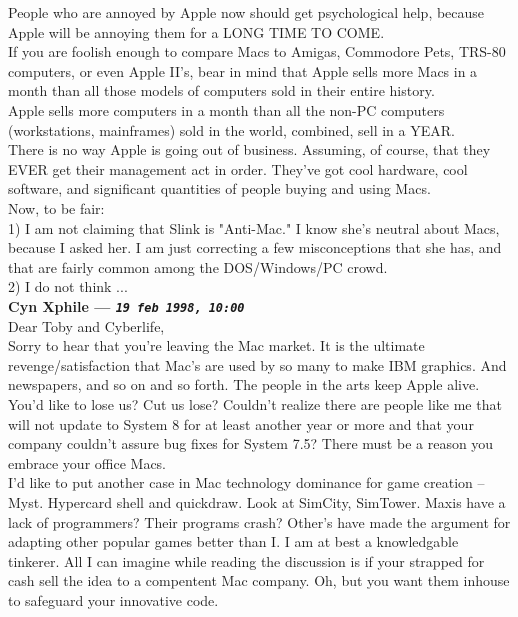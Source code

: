 \documentclass[11pt,twoside,a4paper]{article}
\begin{document}
\begin{multicols*}{2}
People who are annoyed by Apple now should get psychological help, because Apple will be annoying them for a LONG TIME TO COME.~\\

If you are foolish enough to compare Macs to Amigas, Commodore Pets, TRS-80 computers, or even Apple II's, bear in mind that Apple sells more Macs in a month than all those models of computers sold in their entire history.~\\

Apple sells more computers in a month than all the non-PC computers (workstations, mainframes) sold in the world, combined, sell in a YEAR.~\\

There is no way Apple is going out of business. Assuming, of course, that they EVER get their management act in order. They've got cool hardware, cool software, and significant quantities of people buying and using Macs.~\\

Now, to be fair:~\\
1) I am not claiming that Slink is "Anti-Mac." I know she's neutral about Macs, because I asked her. I am just correcting a few misconceptions that she has, and that are fairly common among the DOS/Windows/PC crowd.~\\
2) I do not think ...~\\

 
		
	
		
\textbf{Cyn Xphile --- \emph{\texttt{19 feb 1998, 10:00}}}~\\

Dear Toby and Cyberlife,~\\
Sorry to hear that you're leaving the Mac market.  It is the ultimate revenge/satisfaction that Mac's are used by so many to make IBM graphics.  And newspapers, and so on and so forth.  The people in the arts keep Apple alive. You'd like to lose us?  Cut us lose?  Couldn't realize there are people like me that will not update to System 8 for at least another year or more and that your company couldn't assure bug fixes for System 7.5?  There must be a reason you embrace your office Macs.~\\

I'd like to put another case in Mac technology dominance for game creation -- Myst.  Hypercard shell and quickdraw.  Look at SimCity, SimTower.  Maxis have a lack of programmers?  Their programs crash? Other's have made the argument for adapting other popular games better than I.  I am at best a knowledgable tinkerer.  All I can imagine while reading the discussion is if your strapped for cash sell the idea to a compentent Mac company.  Oh, but you want them inhouse to safeguard your innovative code.~\\


\end{multicols*}
\end{document}
